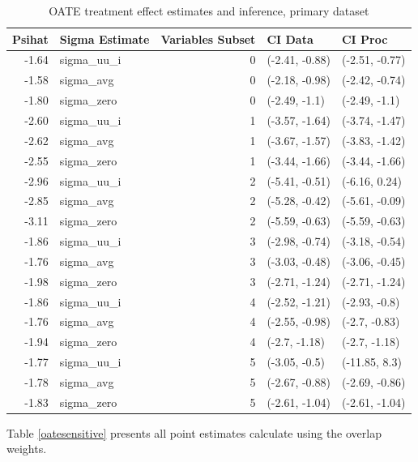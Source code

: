 \documentclass[12pt]{article}
\begin{document}
\begin{table}[ht]
\centering
\begin{tabular}{rlrll}
  \hline
Psihat & Sigma Estimate & Variables Subset & CI Data & CI Proc \\ 
  \hline
-1.64 & sigma\_uu\_i & 0 & (-2.41, -0.88) & (-2.51, -0.77) \\ 
  -1.58 & sigma\_avg & 0 & (-2.18, -0.98) & (-2.42, -0.74) \\ 
  -1.80 & sigma\_zero & 0 & (-2.49, -1.1) & (-2.49, -1.1) \\ 
  -2.60 & sigma\_uu\_i & 1 & (-3.57, -1.64) & (-3.74, -1.47) \\ 
  -2.62 & sigma\_avg & 1 & (-3.67, -1.57) & (-3.83, -1.42) \\ 
  -2.55 & sigma\_zero & 1 & (-3.44, -1.66) & (-3.44, -1.66) \\ 
  -2.96 & sigma\_uu\_i & 2 & (-5.41, -0.51) & (-6.16, 0.24) \\ 
  -2.85 & sigma\_avg & 2 & (-5.28, -0.42) & (-5.61, -0.09) \\ 
  -3.11 & sigma\_zero & 2 & (-5.59, -0.63) & (-5.59, -0.63) \\ 
  -1.86 & sigma\_uu\_i & 3 & (-2.98, -0.74) & (-3.18, -0.54) \\ 
  -1.76 & sigma\_avg & 3 & (-3.03, -0.48) & (-3.06, -0.45) \\ 
  -1.98 & sigma\_zero & 3 & (-2.71, -1.24) & (-2.71, -1.24) \\ 
  -1.86 & sigma\_uu\_i & 4 & (-2.52, -1.21) & (-2.93, -0.8) \\ 
  -1.76 & sigma\_avg & 4 & (-2.55, -0.98) & (-2.7, -0.83) \\ 
  -1.94 & sigma\_zero & 4 & (-2.7, -1.18) & (-2.7, -1.18) \\ 
  -1.77 & sigma\_uu\_i & 5 & (-3.05, -0.5) & (-11.85, 8.3) \\ 
  -1.78 & sigma\_avg & 5 & (-2.67, -0.88) & (-2.69, -0.86) \\ 
  -1.83 & sigma\_zero & 5 & (-2.61, -1.04) & (-2.61, -1.04) \\ 
   \hline
\end{tabular}
   \caption{OATE treatment effect estimates and inference, primary dataset}
   \label{oateprimary}
\end{table}

Table \ref{oatesensitive} presents all point estimates calculate using the overlap weights.
\end{document}
